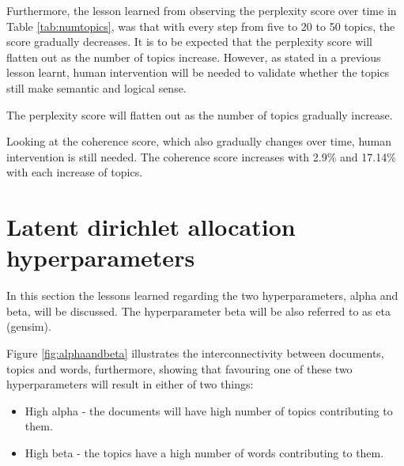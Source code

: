 Furthermore, the lesson learned from observing the perplexity score over time in Table \ref{tab:numtopics}, was that with every step from five to 20 to 50 topics, the score gradually decreases. It is to be expected that the perplexity score will flatten out as the number of topics increase. However, as stated in a previous lesson learnt, human intervention will be needed to validate whether the topics still make semantic and logical sense.

\begin{lesson}
The perplexity score will flatten out as the number of topics gradually increase.
\end{lesson}\label{L:perplexity}

Looking at the coherence score, which also gradually changes over time, human intervention is still needed. The coherence score increases with 2.9\% and 17.14\% with each increase of topics.

\section{Latent dirichlet allocation hyperparameters}

In this section the lessons learned regarding the two hyperparameters, alpha and beta, will be discussed. The hyperparameter beta will be also referred to as eta (gensim).

Figure \ref{fig:alphaandbeta} illustrates the interconnectivity between documents, topics and words, furthermore, showing that favouring one of these two hyperparameters will result in either of two things:

\begin{itemize}
    \item High alpha - the documents will have high number of topics contributing to them.
    \item High beta - the topics have a high number of words contributing to them.
\end{itemize}

